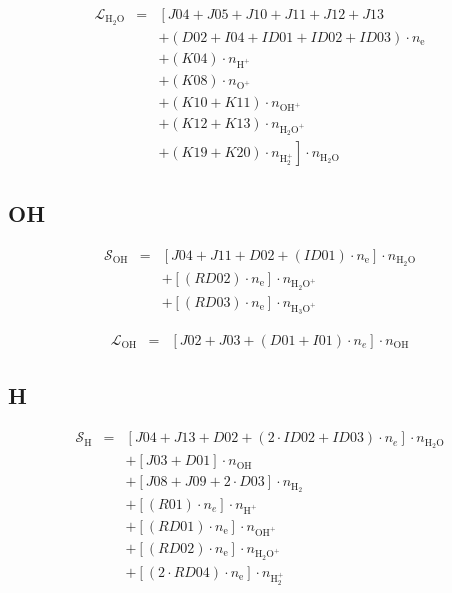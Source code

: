 \documentclass[12pt, letterpaper]{article}
\begin{document}
\begin{eqnarray}
\mathcal{L}_{\text{H}_{2}\text{O}} & = & \left[ J04 + J05 + J10 + J11 + J12 + J13 \right. \nonumber \\
& & \left. + \left( D02 + I04 + ID01 + ID02 + ID03 \right) \cdot n_{\text{e}} \right. \nonumber \\
& & \left. + \left( K04 \right) \cdot n_{\text{H}^{+}} \right. \nonumber \\
& & \left. + \left( K08 \right) \cdot n_{\text{O}^{+}} \right. \nonumber \\
& & \left. + \left( K10 + K11 \right) \cdot n_{\text{OH}^{+}} \right. \nonumber \\
& & \left. + \left( K12 + K13 \right) \cdot n_{\text{H}_{2}\text{O}^{+}} \right. \nonumber \\
& & \left. + \left( K19 + K20 \right) \cdot n_{\text{H}_{2}^{+}} \right] \cdot n_{\text{H}_{2}\text{O}}
\end{eqnarray}

\subsection{OH}

\begin{eqnarray}
\mathcal{S}_{\text{OH}} & = & \left[ J04 + J11 + D02 + \left( ID01 \right) \cdot n_{\text{e}} \right] \cdot n_{\text{H}_{2}\text{O}} \nonumber \\
& & + \left[ \left( RD02 \right) \cdot n_{\text{e}} \right] \cdot n_{\text{H}_{2}\text{O}^{+}} \nonumber \\
& & + \left[ \left( RD03 \right) \cdot n_{\text{e}} \right] \cdot n_{\text{H}_{3}\text{O}^{+}}
\end{eqnarray}

\begin{eqnarray}
\mathcal{L}_{\text{OH}} & = & \left[ J02 + J03 + \left( D01 + I01 \right) \cdot n_{e} \right] \cdot n_{\text{OH}}
\end{eqnarray}

\subsection{H}

\begin{eqnarray}
\mathcal{S}_{\text{H}} & = & \left[ J04 + J13 + D02 + \left( 2 \cdot ID02 + ID03 \right) \cdot n_{e} \right] \cdot n_{\text{H}_{2}\text{O}} \nonumber \\
&  & + \left[ J03 + D01 \right] \cdot n_{\text{OH}} \nonumber \\
&  & + \left[ J08 + J09 + 2 \cdot D03 \right] \cdot n_{\text{H}_{2}} \nonumber \\
&  & + \left[ \left( R01 \right) \cdot n_{e} \right] \cdot n_{\text{H}^{+}} \nonumber \\
&  & + \left[ \left( RD01 \right) \cdot n_{\text{e}} \right] \cdot n_{\text{OH}^{+}} \nonumber \\
&  & + \left[ \left( RD02 \right) \cdot n_{\text{e}} \right] \cdot n_{\text{H}_{2} \text{O}^{+}} \nonumber \\
&  & + \left[ \left( 2 \cdot RD04 \right) \cdot n_{\text{e}} \right] \cdot n_{\text{H}_{2}^{+}}
\end{eqnarray}
\end{document}
